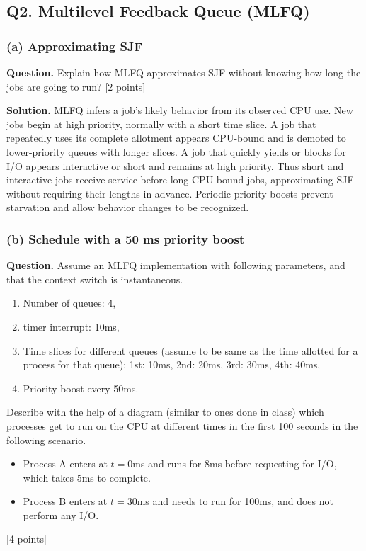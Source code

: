 \subsection*{Q2. Multilevel Feedback Queue (MLFQ)}

\subsubsection*{(a) Approximating SJF}
\textbf{Question.} Explain how MLFQ approximates SJF without knowing how long
the jobs are going to run? \hfill [2 points]

\textbf{Solution.}
MLFQ infers a job's likely behavior from its observed CPU use.  New jobs begin
at high priority, normally with a short time slice.  A job that repeatedly
uses its complete allotment appears CPU-bound and is demoted to lower-priority
queues with longer slices.  A job that quickly yields or blocks for I/O
appears interactive or short and remains at high priority.  Thus short and
interactive jobs receive service before long CPU-bound jobs, approximating
SJF without requiring their lengths in advance.  Periodic priority boosts
prevent starvation and allow behavior changes to be recognized.

\subsubsection*{(b) Schedule with a 50 ms priority boost}
\textbf{Question.} Assume an MLFQ implementation with following parameters,
and that the context switch is instantaneous.
\begin{enumerate}
  \item[(a)] Number of queues: 4,
  \item[(b)] timer interrupt: 10ms,
  \item[(c)] Time slices for different queues (assume to be same as the time
        allotted for a process for that queue): 1st: 10ms, 2nd: 20ms,
        3rd: 30ms, 4th: 40ms,
  \item[(d)] Priority boost every 50ms.
\end{enumerate}
Describe with the help of a diagram (similar to ones done in class) which
processes get to run on the CPU at different times in the first 100 seconds in
the following scenario.
\begin{itemize}
  \item Process A enters at \(t=0\)ms and runs for 8ms before requesting for
        I/O, which takes 5ms to complete.
  \item Process B enters at \(t=30\)ms and needs to run for 100ms, and does not
        perform any I/O.
\end{itemize}
\hfill [4 points]

